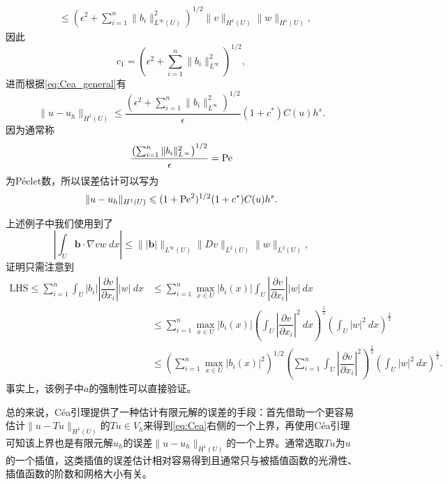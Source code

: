 \documentclass[a4paper,10pt]{ctexart}
\begin{document}
\begin{example}
\[\begin{aligned}
            &\leqslant \left( \epsilon^2 + \sum_{i=1}^n\| b_i \|^2_{L^\infty(U)} \right)^{1 / 2}  \| v \|_{H^1(U)} \| w \|_{H^1(U)},
        \end{aligned}
    \]
    因此
    \begin{equation}
        c_1 = \left( \epsilon^2+\sum_{i=1}^n\| b_i \|_{L^\infty}^2  \right)^{1 / 2},
    \end{equation}
    进而根据\eqref{eq:Cea_general}有
    \begin{equation}
        \| u-u_h \|_{H^1(U)} \leqslant \frac{\left( \epsilon^2+\sum_{i=1}^n\| b_i \|_{L^\infty}^2  \right)^{1 / 2}}{\epsilon} (1+c^*) C(u) h^s.
    \end{equation}
    因为通常称
    \begin{equation}
        \frac{\left( \sum_{i=1}^n\| b_i \|_{L^\infty}^2  \right)^{1 / 2}}{\epsilon} = {\rm Pe}
    \end{equation}
    为Péclet数，所以误差估计可以写为
    \begin{equation}
        \| u-u_h \|_{H^1(U)} \leqslant (1+{\rm Pe}^2)^{1 / 2} (1+c^*) C(u) h^s.
    \end{equation}
\end{example}
上述例子中我们使用到了
\[
    \left| \int_U \bm{b}\cdot \nabla vw\ d x  \right| \leqslant \| |\bm{b}| \|_{L^\infty(U)} \| Dv \|_{L^2(U)} \| w \|_{L^2(U)},
\]
证明只需注意到
\[
    \begin{aligned}
        \text{LHS} \leqslant \sum_{i=1}^n \int_U |b_i||\dfrac{\partial v}{\partial x_i} ||w|\ d x 
        &\leqslant \sum_{i=1}^n \max_{x\in U}|b_i(x)|\int_U |\dfrac{\partial v}{\partial x_i} ||w|\ d x \\
        &\leqslant \sum_{i=1}^n \max_{x\in U}|b_i(x)| \left( \int_U |\dfrac{\partial v}{\partial x_i} |^2\ dx \right)^{\frac{1}{2}} \left(  \int_U|w|^2\ d x \right)^{\frac{1}{2}} \\
        &\leqslant \left( \sum_{i=1}^n \max_{x\in U}|b_i(x)|^2 \right)^{1 / 2} \left( \sum_{i=1}^n \int_U |\dfrac{\partial v}{\partial x_i}|^2  \right)^{\frac{1}{2}} \left( \int_U |w|^2\ d x \right)^{\frac{1}{2}}.
    \end{aligned}
\]
事实上，该例子中$ a $的强制性可以直接验证。

总的来说，Céa引理提供了一种估计有限元解的误差的手段：首先借助一个更容易估计$ \| u-Tu \|_{H^1(U)} $的$ Tu\in V_h $来得到\eqref{eq:Cea}右侧的一个上界，再使用Céa引理可知该上界也是有限元解$ u_h $的误差$ \| u-u_h \|_{H^1(U)} $的一个上界。通常选取$ Tu $为$ u $的一个插值，这类插值的误差估计相对容易得到且通常只与被插值函数的光滑性、插值函数的阶数和网格大小有关。
\end{document}
